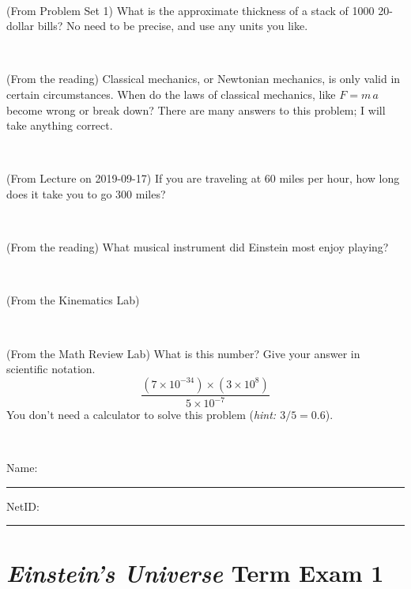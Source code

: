 \documentclass[12pt, letterpaper]{article}
\begin{document}
\vfill ~

\begin{problem} (From Problem Set 1)
What is the approximate thickness of a stack of 1000 20-dollar bills?
No need to be precise, and use any units you like.
\end{problem}


\vfill ~

\begin{problem} (From the reading)
Classical mechanics, or Newtonian mechanics, is only valid in certain
circumstances. When do the laws of classical mechanics, like $F =
m\,a$ become wrong or break down? There are many answers to this
problem; I will take anything correct.
\end{problem}


\vfill ~


\clearpage


\begin{problem} (From Lecture on 2019-09-17)
If you are traveling at 60 miles per hour, how long does
it take you to go 300 miles?
\end{problem}


\vfill ~

\begin{problem} (From the reading)
What musical instrument did Einstein most enjoy playing?
\end{problem}


\vfill ~

\begin{problem} (From the Kinematics Lab)

\end{problem}


\vfill ~

\begin{problem} (From the Math Review Lab)
What is this number? Give your answer in scientific notation.
$$
\frac{(7\times10^{-34})\times(3\times10^8)}{5\times10^{-7}}
$$
You don't need a calculator to solve this problem (\textit{hint: $3/5=0.6$}).
\end{problem}


\vfill ~


\cleardoublepage



\noindent
Name: \rule[-1ex]{0.60\textwidth}{0.1pt}
NetID: \rule[-1ex]{0.20\textwidth}{0.1pt}

\section*{\textsl{Einstein's Universe} Term Exam 1}
\setcounter{problem}{1}
\end{document}
